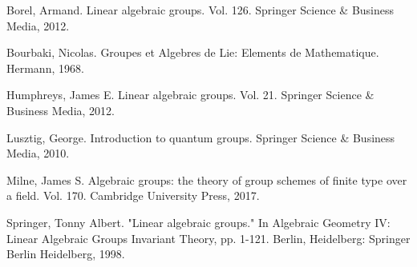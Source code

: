 \begin{comment}
\begin{defn}
	The \textbf{Weyl group} of a root system $(E,\Phi)$ is the subgroup $W\subset \GL(E)$ generated by the reflections $s_\alpha$, $\alpha\in \Phi$.

	For a semisimple Lie algebra $\mfg$, its \textbf{Weyl group} $W$ is the Weyl group of its root system.
\end{defn}

\begin{rem}
	The action of $W$ on $E$ preserves $E_\mBQ$ and therefore induces actions on $\mft^*$ and $\mft$.
\end{rem}

\begin{exam}
	The Weyl group of $\sl_n$ is the symmetric group $\Sigma_n$. It acts on the standard Cartan in the obvious way.
\end{exam}

	We state several well-known results about the Weyl group:

\begin{prop}
	Let $(E,\Phi)$ and $(E^*,\check \Phi)$ be root systems dual to each other. Then their Weyl groups are isomorphic, with $s_\alpha$ corresponding to $s_{\check \alpha}$.
\end{prop}

\begin{rem}
	Weyl groups are \emph{(crystallographic) Coxeter groups}. Namely, if we choose positive roots $\Phi^+\subset \Phi$ and simple roots $\mathsf{\Delta}\subset \Phi^+$. Then
	\[
		W  = \langle s_\alpha, \alpha\in \mathsf{\Delta} \,\vert\, s_\alpha^2=1, (s_\alpha s_\beta)^{m_\alpha\beta}=1, \alpha\neq \beta \rangle
	\]
	where $m_{\alpha\beta}\in \{2,3,4,6\}$.
\end{rem}
\end{comment}

	




\begin{thebibliography}{Yau}

 Borel, Armand. Linear algebraic groups. Vol. 126. Springer Science \& Business Media, 2012.

 Bourbaki, Nicolas. Groupes et Algebres de Lie: Elements de Mathematique. Hermann, 1968.

 Humphreys, James E. Linear algebraic groups. Vol. 21. Springer Science \& Business Media, 2012.

 Lusztig, George. Introduction to quantum groups. Springer Science \& Business Media, 2010.

 Milne, James S. Algebraic groups: the theory of group schemes of finite type over a field. Vol. 170. Cambridge University Press, 2017.


 Springer, Tonny Albert. "Linear algebraic groups." In Algebraic Geometry IV: Linear Algebraic Groups Invariant Theory, pp. 1-121. Berlin, Heidelberg: Springer Berlin Heidelberg, 1998.

\end{thebibliography}

 


